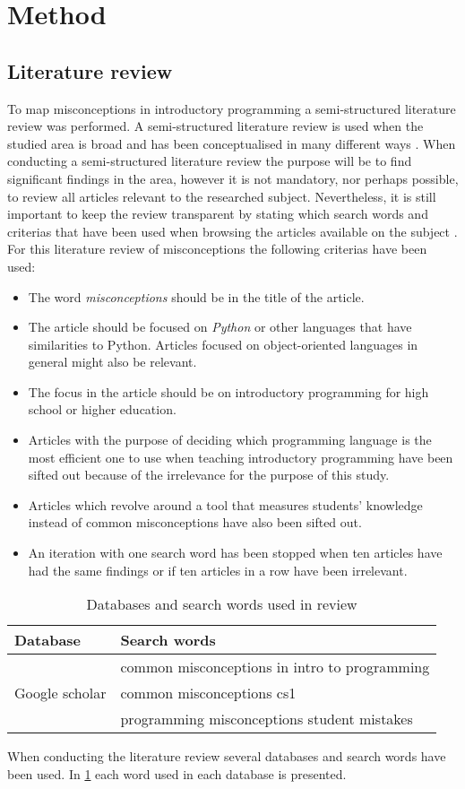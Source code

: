 \mode*
\section{Method}
\subsection{Literature review}
To map misconceptions in introductory programming a semi-structured 
literature review was performed. A semi-structured literature review is used 
when the studied area is broad and has been conceptualised in many different 
ways \parencite{Snyder2019}. When conducting a semi-structured literature 
review the purpose will be to find significant findings in the area, however 
it is not mandatory, nor perhaps possible, to review all articles relevant 
to the researched subject. Nevertheless, it is still important to keep the 
review transparent by stating which search words and criterias that have 
been 
used when browsing the articles available on the subject 
\parencite{Snyder2019}.
For this literature review of misconceptions the following criterias have 
been used:
\begin{itemize}
\item The word \emph{misconceptions} should be in the title of the article.
\item The article should be focused on \emph{Python} or other languages that 
have similarities to Python. Articles focused on object-oriented languages 
in 
general might also be relevant.
\item The focus in the article should be on introductory programming for 
high 
school or higher education.
\item Articles with the purpose of deciding which programming language is 
the 
most efficient one to use when teaching introductory programming have been 
sifted out because of the irrelevance for the purpose of this study.
\item Articles which revolve around a tool that measures students' knowledge 
instead of common misconceptions have also been sifted out.
\item An iteration with one search word has been stopped when ten articles 
have had the same findings or if ten articles in a row have been irrelevant.
\end{itemize}
\begin{table}[h]
\centering
\begin{tabular}{ll}
\toprule
Database & Search words\\
\midrule
\multirow{3}{4em}{Google scholar} & common misconceptions in intro to 
programming \\
& common misconceptions cs1 \\
& programming misconceptions student mistakes \\
\bottomrule
\end{tabular}
\caption{Databases and search words used in review}
\label{databasesandwords}
\end{table}
When conducting the literature review several databases and search words 
have 
been used. In \cref{databasesandwords} each word used in each database is 
presented.

